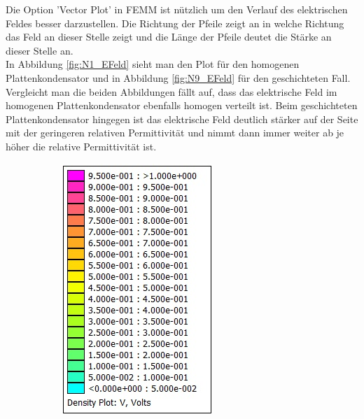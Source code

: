 Die Option 'Vector Plot' in FEMM ist nützlich um den Verlauf des elektrischen Feldes besser darzustellen. Die Richtung der Pfeile zeigt an in welche Richtung das Feld an dieser Stelle zeigt und die Länge der Pfeile deutet die Stärke an dieser Stelle an.\\
In Abbildung \ref{fig:N1_EFeld} sieht man den Plot für den homogenen Plattenkondensator und in Abbildung \ref{fig:N9_EFeld} für den geschichteten Fall. Vergleicht man die beiden Abbildungen fällt auf, dass das elektrische Feld im homogenen Plattenkondensator ebenfalls homogen verteilt ist. Beim geschichteten Plattenkondensator hingegen ist das elektrische Feld deutlich stärker auf der Seite mit der geringeren relativen Permittivität und nimmt dann immer weiter ab je höher die relative Permittivität ist.

\begin{figure}[h]
	\begin{subfigure}[c]{0.2\textwidth}
		\includegraphics[width=\textwidth]{data/KondensatorN9_Legende}

\end{subfigure}
\end{figure}
